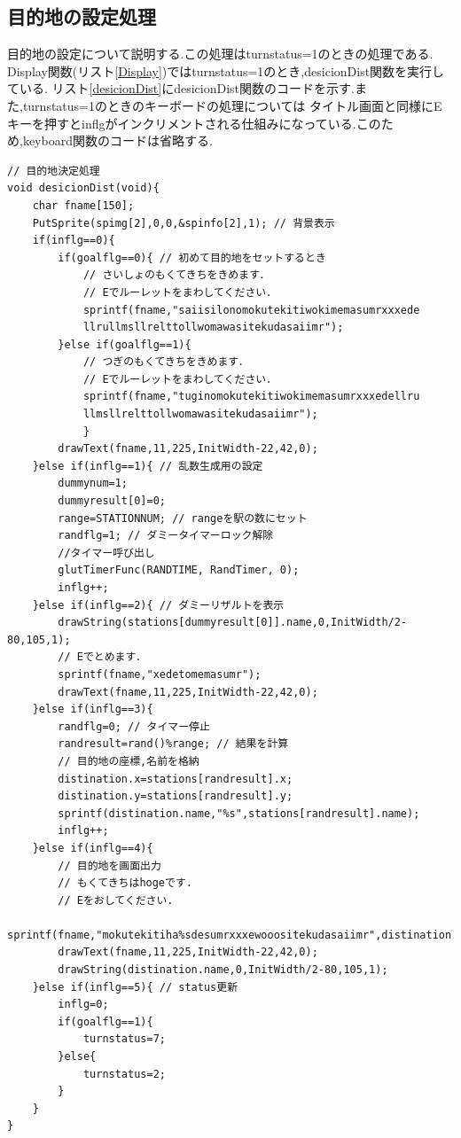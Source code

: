 \documentclass[a4j]{jarticle}
\begin{document}
    \subsection{目的地の設定処理}
    目的地の設定について説明する.この処理はturnstatus=1のときの処理である. Display関数(リスト\ref{Display})ではturnstatus=1のとき,desicionDist関数を実行している. 
    リスト\ref{desicionDist}にdesicionDist関数のコードを示す.また,turnstatus=1のときのキーボードの処理については
    タイトル画面と同様にEキーを押すとinflgがインクリメントされる仕組みになっている.このため,keyboard関数のコードは省略する.
        \begin{lstlisting}[basicstyle=\ttfamily\footnotesize, frame=single,label=desicionDist,caption=desicionDist関数]
// 目的地決定処理
void desicionDist(void){
    char fname[150];
    PutSprite(spimg[2],0,0,&spinfo[2],1); // 背景表示
    if(inflg==0){
        if(goalflg==0){ // 初めて目的地をセットするとき
            // さいしょのもくてきちをきめます．
            // Eでルーレットをまわしてください．
            sprintf(fname,"saiisilonomokutekitiwokimemasumrxxxede
            llrullmsllrelttollwomawasitekudasaiimr");             
        }else if(goalflg==1){
            // つぎのもくてきちをきめます．
            // Eでルーレットをまわしてください．                
            sprintf(fname,"tuginomokutekitiwokimemasumrxxxedellru
            llmsllrelttollwomawasitekudasaiimr");                 
            }
        drawText(fname,11,225,InitWidth-22,42,0);
    }else if(inflg==1){ // 乱数生成用の設定
        dummynum=1;
        dummyresult[0]=0;
        range=STATIONNUM; // rangeを駅の数にセット
        randflg=1; // ダミータイマーロック解除
        //タイマー呼び出し
        glutTimerFunc(RANDTIME, RandTimer, 0);
        inflg++;
    }else if(inflg==2){ // ダミーリザルトを表示
        drawString(stations[dummyresult[0]].name,0,InitWidth/2-80,105,1); 
        // Eでとめます．
        sprintf(fname,"xedetomemasumr");
        drawText(fname,11,225,InitWidth-22,42,0);             
    }else if(inflg==3){
        randflg=0; // タイマー停止
        randresult=rand()%range; // 結果を計算
        // 目的地の座標,名前を格納
        distination.x=stations[randresult].x;
        distination.y=stations[randresult].y;
        sprintf(distination.name,"%s",stations[randresult].name);
        inflg++;
    }else if(inflg==4){
        // 目的地を画面出力
        // もくてきちはhogeです.
        // Eをおしてください.
        sprintf(fname,"mokutekitiha%sdesumrxxxewooositekudasaiimr",distination.name);
        drawText(fname,11,225,InitWidth-22,42,0); 
        drawString(distination.name,0,InitWidth/2-80,105,1);  
    }else if(inflg==5){ // status更新
        inflg=0;
        if(goalflg==1){
            turnstatus=7;
        }else{
            turnstatus=2;
        }
    }
}
        \end{lstlisting} 
    
\end{document}
